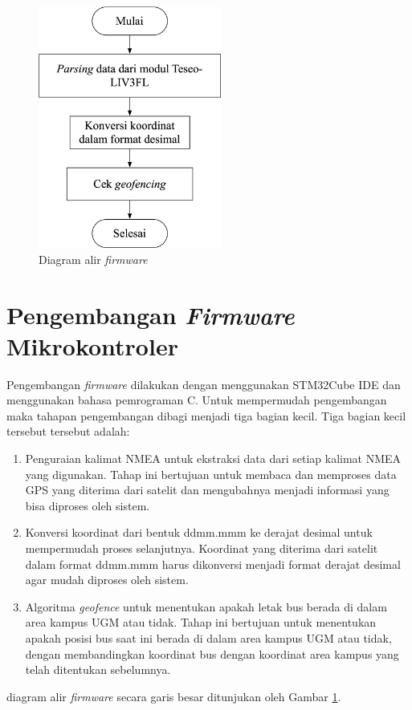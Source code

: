 \begin{figure}[H]
	\centering
	\includegraphics[width=6cm]{contents/chapter-3/firmware-diagram.png}
	\caption{Diagram alir \textit{firmware}}
	\label{Fig: flowchart-firmware}
\end{figure}

\section{Pengembangan \textit{Firmware} Mikrokontroler}
Pengembangan \textit{firmware} dilakukan dengan menggunakan STM32Cube IDE dan menggunakan bahasa pemrograman C. Untuk mempermudah pengembangan maka tahapan pengembangan dibagi menjadi tiga bagian kecil. Tiga bagian kecil tersebut tersebut adalah:
\begin{enumerate}
	\item Penguraian kalimat NMEA untuk ekstraksi data dari setiap kalimat NMEA yang digunakan. Tahap ini bertujuan untuk membaca dan memproses data GPS yang diterima dari satelit dan mengubahnya menjadi informasi yang bisa diproses oleh sistem.
	\item Konversi koordinat dari bentuk ddmm.mmm ke derajat desimal untuk mempermudah proses selanjutnya. Koordinat yang diterima dari satelit dalam format ddmm.mmm harus dikonversi menjadi format derajat desimal agar mudah diproses oleh sistem.
	\item Algoritma \textit{geofence} untuk menentukan apakah letak bus berada di dalam area kampus UGM atau tidak. Tahap ini bertujuan untuk menentukan apakah posisi bus saat ini berada di dalam area kampus UGM atau tidak, dengan membandingkan koordinat bus dengan koordinat area kampus yang telah ditentukan sebelumnya.
\end{enumerate}
diagram alir \textit{firmware} secara garis besar ditunjukan oleh Gambar \ref{Fig: flowchart-firmware}.

